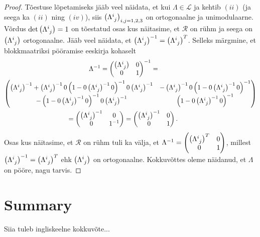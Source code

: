 \documentclass[a4paper,12pt]{article}
\theoremstyle{plain}
\theoremstyle{definition}
\numberwithin{equation}{section}
\begin{document}
\begin{proof}
Tõestuse lõpetamiseks jääb veel näidata, et kui $\Lambda \in \mathcal{L}$ ja kehtib $(ii)$ (ja seega ka $(ii)$ ning $(iv)$), siis $\left(\Lambda\indices{^i_j}\right)_{i,j = 1, 2, 3}$ on ortogonaalne ja unimodulaarne. Võrdus $\det \left(\Lambda\indices{^i_j}\right) = 1$ on tõestatud osas kus näitasime, et $\mathcal{R}$ on rühm ja seega on $\left(\Lambda\indices{^i_j}\right)$ ortogonaalne. Jääb veel näidata, et $\left(\Lambda\indices{^i_j}\right)^{-1} = \left(\Lambda\indices{^i_j}\right)^T$. Selleks märgmine, et blokkmaatriksi pööramise eeskirja kohaselt
\begin{align*}
\Lambda^{-1} = 
\begin{pmatrix}
\left(\Lambda\indices{^i_j}\right) & 0 \\
0 & 1 \\ 
\end{pmatrix}^{-1} = \qquad\qquad\qquad\qquad\qquad\qquad\qquad\quad\\
\begin{pmatrix}
\left(\Lambda\indices{^i_j}\right)^{-1} + \left(\Lambda\indices{^i_j}\right)^{-1} 0  \left(1-0 \left(\Lambda\indices{^i_j}\right)
^{-1} 0 \right)^{-1} 0 \left(\Lambda\indices{^i_j}\right)^{-1} & -\left(\Lambda\indices{^i_j}\right)^{-1} 0 \left(1 - 0 \left
(\Lambda\indices{^i_j}\right)^{-1} 0 \right)^{-1} \\
-\left(1 - 0 \left(\Lambda\indices{^i_j}\right)^{-1} 0\right)^{-1} 0 \left(\Lambda\indices{^i_j}\right)^{-1} & \left(1 - 0 \left
(\Lambda\indices{^i_j}\right)^{-1} 0 \right)^{-1} \\
\end{pmatrix} \\
 = \begin{pmatrix}
\left(\Lambda\indices{^i_j}\right)^{-1} & 0 \\
0 & 1^{-1} \\ 
\end{pmatrix} = 
\begin{pmatrix}
\left(\Lambda\indices{^i_j}\right)^{-1} & 0 \\
0 & 1 \\ 
\end{pmatrix}. \qquad\qquad\qquad\qquad\qquad\qquad
\end{align*}
Osas kus näitasime, et $\mathcal{R}$ on rühm tuli ka välja, et $\Lambda^{-1} = \begin{pmatrix} \left(\Lambda\indices{^i_j}\right)^T & 0 \\ 0 & 1 \\ \end{pmatrix}$, millest $\left(\Lambda\indices{^i_j}\right)^{-1} = \left(\Lambda\indices{^i_j}\right)^T$ ehk $\left(\Lambda\indices{^i_j}\right)$ on ortogonaalne. Kokkuvõttes oleme näidanud, et $\Lambda$ on pööre, nagu tarvis.
\end{proof}

\newpage
\section*{Summary}
Siia tuleb ingliskeelne kokkuvõte...

\newpage
{}


\end{document}
